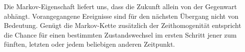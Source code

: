 Die Markov-Eigenschaft liefert uns, dass die Zukunft allein von der Gegenwart abhängt. Vorangegangene Ereignisse sind für den nächsten Übergang nicht von Bedeutung. Genügt die Markov-Kette zusätzlich der Zeithomogenität entspricht die Chance für einen bestimmten Zustandswechsel im ersten Schritt jener zum fünften, letzten oder
jedem beliebigen anderen Zeitpunkt.